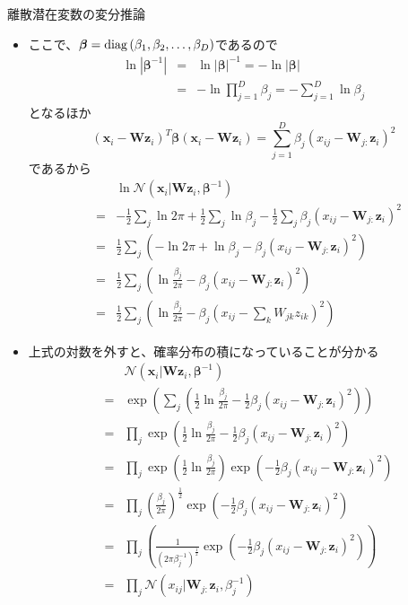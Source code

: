 \documentclass[dvipdfmx,notheorems,t]{beamer}
\begin{document}
\begin{frame}{離散潜在変数の変分推論}
\begin{itemize}
\begin{itemize}
		\item ここで、$\bm{\beta} = \operatorname{diag} \left( \beta_1, \beta_2, \ldots, \beta_D \right)$であるので
		\begin{eqnarray}
			\ln |\bm{\beta}^{-1}| &=& \ln |\bm{\beta}|^{-1} = - \ln |\bm{\beta}| \nonumber \\
			&=& - \ln \prod_{j = 1}^D \beta_j = - \sum_{j = 1}^D \ln \beta_j
		\end{eqnarray}
		となるほか
		\begin{equation}
			\left( \bm{x}_i - \bm{W} \bm{z}_i \right)^T \bm{\beta} \left( \bm{x}_i - \bm{W} \bm{z}_i \right) = \sum_{j = 1}^D \beta_j \left( x_{ij} - \bm{W}_{j:} \bm{z}_i \right)^2
		\end{equation}
		であるから
		\begin{eqnarray}
			&& \ln \mathcal{N}(\bm{x}_i | \bm{W} \bm{z}_i, \bm{\beta}^{-1}) \nonumber \\
			&=& -\frac{1}{2} \sum_j \ln 2\pi + \frac{1}{2} \sum_j \ln \beta_j - \frac{1}{2} \sum_j \beta_j \left( x_{ij} - \bm{W}_{j:} \bm{z}_i \right)^2 \\
			&=& \frac{1}{2} \sum_j \left( -\ln 2\pi + \ln \beta_j - \beta_j \left( x_{ij} - \bm{W}_{j:} \bm{z}_i \right)^2 \right) \\
			&=& \frac{1}{2} \sum_j \left( \ln \frac{\beta_j}{2\pi} - \beta_j \left( x_{ij} - \bm{W}_{j:} \bm{z}_i \right)^2 \right) \\
			&=& \frac{1}{2} \sum_j \left( \ln \frac{\beta_j}{2\pi} - \beta_j \left( x_{ij} - \sum_k W_{jk} z_{ik} \right)^2 \right)
		\end{eqnarray}
		
		\item 上式の対数を外すと、確率分布の積になっていることが分かる
		\begin{eqnarray}
			&& \mathcal{N}(\bm{x}_i | \bm{W} \bm{z}_i, \bm{\beta}^{-1}) \nonumber \\
			&=& \exp \left( \sum_j \left( \frac{1}{2} \ln \frac{\beta_j}{2\pi} - \frac{1}{2} \beta_j \left( x_{ij} - \bm{W}_{j:} \bm{z}_i \right)^2 \right) \right) \\
			&=& \prod_j \exp \left( \frac{1}{2} \ln \frac{\beta_j}{2\pi} - \frac{1}{2} \beta_j \left( x_{ij} - \bm{W}_{j:} \bm{z}_i \right)^2 \right) \\
			&=& \prod_j \exp \left( \frac{1}{2} \ln \frac{\beta_j}{2\pi} \right) \exp \left( - \frac{1}{2} \beta_j \left( x_{ij} - \bm{W}_{j:} \bm{z}_i \right)^2 \right) \\
			&=& \prod_j \left( \frac{\beta_j}{2\pi} \right)^\frac{1}{2} \exp \left( - \frac{1}{2} \beta_j \left( x_{ij} - \bm{W}_{j:} \bm{z}_i \right)^2 \right) \\
			&=& \prod_j \left( \frac{1}{(2\pi \beta_j^{-1})^\frac{1}{2}} \exp \left( - \frac{1}{2} \beta_j \left( x_{ij} - \bm{W}_{j:} \bm{z}_i \right)^2 \right) \right) \\
			&=& \prod_j \mathcal{N}(x_{ij} | \bm{W}_{j:} \bm{z}_i, \beta_j^{-1})
		\end{eqnarray}
		

\end{itemize}
\end{itemize}
\end{frame}
\end{document}
